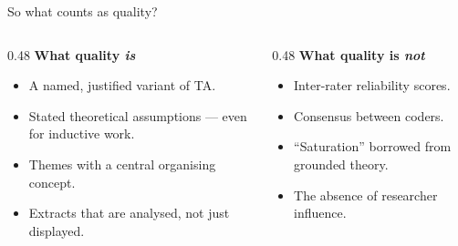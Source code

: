 \begin{frame}{So what counts as quality?}
\vspace{-0.2em}
\begin{columns}[T,onlytextwidth]
\begin{column}{0.48\textwidth}
\vspace{0.3em}
{\color{sage!55!black}\small\bfseries What quality \emph{is}}
\begin{itemize}\setlength{\itemsep}{0.1em}\small
  \item<1-> A named, justified variant of TA.
  \item<1-> Stated theoretical assumptions --- even for inductive work.
  \item<1-> Themes with a central organising concept.
  \item<1-> Extracts that are analysed, not just displayed.
\end{itemize}
\end{column}
\begin{column}{0.48\textwidth}
\vspace{0.3em}
{\color{rose}\small\bfseries What quality is \emph{not}}
\begin{itemize}\setlength{\itemsep}{0.1em}\small
  \item<2-> Inter-rater reliability scores.
  \item<2-> Consensus between coders.
  \item<2-> ``Saturation'' borrowed from grounded theory.
  \item<2-> The absence of researcher influence.
\end{itemize}
\end{column}
\end{columns}

\vspace{0.7em}
\end{frame}

